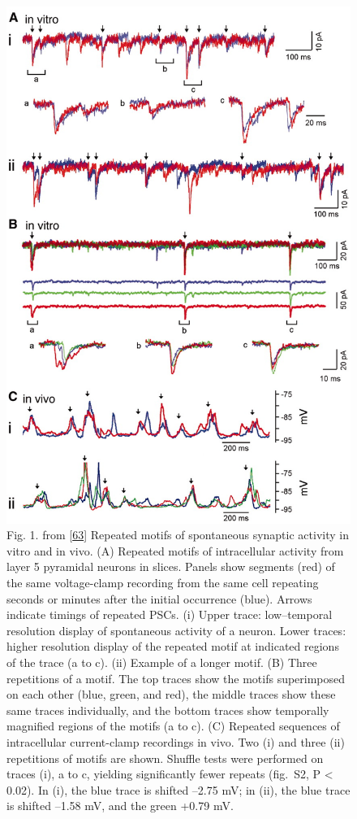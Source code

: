 \begin{figure}
\hypertarget{fig:Ikegaya2004}{%
\centering
\includegraphics{images/Ikegaya2004zse0150424620001.jpeg}
\caption{Fig. 1. from {[}\protect\hyperlink{ref-Mf6h1KNY}{63}{]} Repeated motifs of spontaneous synaptic activity in vitro and in vivo. (A) Repeated motifs of intracellular activity from layer 5 pyramidal neurons in slices. Panels show segments (red) of the same voltage-clamp recording from the same cell repeating seconds or minutes after the initial occurrence (blue). Arrows indicate timings of repeated PSCs. (i) Upper trace: low--temporal resolution display of spontaneous activity of a neuron. Lower traces: higher resolution display of the repeated motif at indicated regions of the trace (a to c). (ii) Example of a longer motif. (B) Three repetitions of a motif. The top traces show the motifs superimposed on each other (blue, green, and red), the middle traces show these same traces individually, and the bottom traces show temporally magnified regions of the motifs (a to c). (C) Repeated sequences of intracellular current-clamp recordings in vivo. Two (i) and three (ii) repetitions of motifs are shown. Shuffle tests were performed on traces (i), a to c, yielding significantly fewer repeats (fig.~S2, P \textless{} 0.02). In (i), the blue trace is shifted --2.75 mV; in (ii), the blue trace is shifted --1.58 mV, and the green +0.79 mV.}\label{fig:Ikegaya2004}
}
\end{figure}

